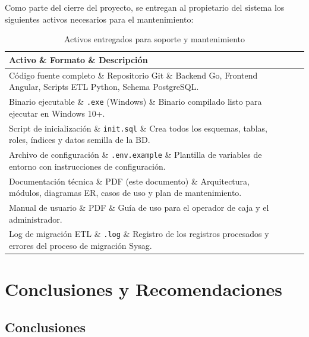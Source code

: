 \documentclass[12pt,a4paper,oneside]{report}
\begin{document}
Como parte del cierre del proyecto, se entregan al propietario del sistema los siguientes activos necesarios para el mantenimiento:

\begin{table}[H]
\centering
\caption{Activos entregados para soporte y mantenimiento}
\begin{tabularx}{\textwidth}{|l|l|X|}
\hline
\rowcolor{lightgray}
\textbf{Activo} \& \textbf{Formato} \& \textbf{Descripción} \\
\hline
Código fuente completo \& Repositorio Git \& Backend Go, Frontend Angular, Scripts ETL Python, Schema PostgreSQL. \\
\hline
Binario ejecutable \& \texttt{.exe} (Windows) \& Binario compilado listo para ejecutar en Windows 10+. \\
\hline
Script de inicialización \& \texttt{init.sql} \& Crea todos los esquemas, tablas, roles, índices y datos semilla de la BD. \\
\hline
Archivo de configuración \& \texttt{.env.example} \& Plantilla de variables de entorno con instrucciones de configuración. \\
\hline
Documentación técnica \& PDF (este documento) \& Arquitectura, módulos, diagramas ER, casos de uso y plan de mantenimiento. \\
\hline
Manual de usuario \& PDF \& Guía de uso para el operador de caja y el administrador. \\
\hline
Log de migración ETL \& \texttt{.log} \& Registro de los registros procesados y errores del proceso de migración Sysag. \\
\hline
\end{tabularx}
\label{tab:activos}
\end{table}

\chapter{Conclusiones y Recomendaciones}

\section{Conclusiones}
\end{document}

